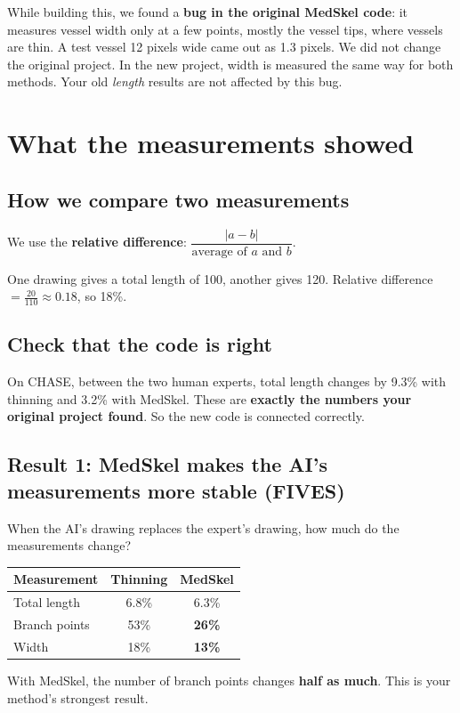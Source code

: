 \documentclass[11pt,a4paper]{article}
\begin{document}
\begin{honest}
While building this, we found a \textbf{bug in the original MedSkel code}: it measures vessel width only at a few points, mostly the vessel tips, where vessels are thin. A test vessel 12 pixels wide came out as 1.3 pixels. We did not change the original project. In the new project, width is measured the same way for both methods. Your old \emph{length} results are not affected by this bug.
\end{honest}

\section{What the measurements showed}

\subsection{How we compare two measurements}
We use the \textbf{relative difference}: $\dfrac{|a-b|}{\text{average of } a \text{ and } b}$.
\begin{example}[]
One drawing gives a total length of 100, another gives 120. Relative difference $= \frac{20}{110} \approx 0.18$, so 18\%.
\end{example}

\subsection{Check that the code is right}
On CHASE, between the two human experts, total length changes by 9.3\% with thinning and 3.2\% with MedSkel. These are \textbf{exactly the numbers your original project found}. So the new code is connected correctly.

\subsection{Result 1: MedSkel makes the AI's measurements more stable (FIVES)}
When the AI's drawing replaces the expert's drawing, how much do the measurements change?
\begin{center}
\begin{tabular}{@{}lcc@{}}
\toprule
\textbf{Measurement} & \textbf{Thinning} & \textbf{MedSkel} \\
\midrule
Total length & 6.8\% & 6.3\% \\
Branch points & 53\% & \textbf{26\%} \\
Width & 18\% & \textbf{13\%} \\
\bottomrule
\end{tabular}
\end{center}
With MedSkel, the number of branch points changes \textbf{half as much}. This is your method's strongest result.
\end{document}
